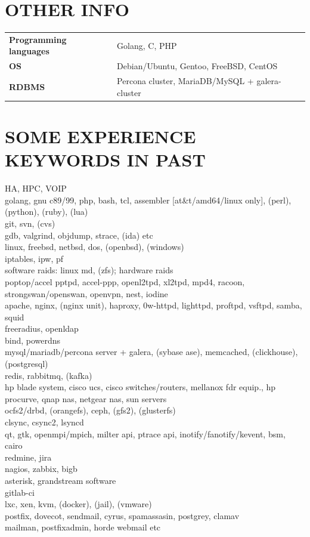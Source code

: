\begin{resume}
\section{OTHER INFO}
\vspace{0.1in} 
\begin{tabular}{ll}
{\bf Programming languages} & Golang, C, PHP\\
{\bf OS}                    & Debian/Ubuntu, Gentoo, FreeBSD, CentOS\\
{\bf RDBMS}                 & Percona cluster, MariaDB/MySQL + galera-cluster\\
\end{tabular}

\section{SOME EXPERIENCE KEYWORDS IN PAST}
\vspace{0.1in} 
    HA, HPC, VOIP\\
    golang, gnu c89/99, php, bash, tcl, assembler [at\&t/amd64/linux only], (perl), (python), (ruby), (lua)\\
    git, svn, (cvs)\\
    gdb, valgrind, objdump, strace, (ida) etc\\
    linux, freebsd, netbsd, dos, (openbsd), (windows)\\
    iptables, ipw, pf\\
    software raids: linux md, (zfs); hardware raids\\
    poptop/accel pptpd, accel-ppp, openl2tpd, xl2tpd, mpd4, racoon, strongswan/openswan, openvpn, nest, iodine\\
    apache, nginx, (nginx unit), haproxy, 0w-httpd, lighttpd, proftpd, vsftpd, samba, squid\\
    freeradius, openldap\\
    bind, powerdns\\
    mysql/mariadb/percona server + galera, (sybase ase), memcached, (clickhouse), (postgresql)\\
    redis, rabbitmq, (kafka)\\
    hp blade system, cisco ucs, cisco switches/routers, mellanox fdr equip., hp procurve, qnap nas, netgear nas, sun servers\\
    ocfs2/drbd, (orangefs), ceph, (gfs2), (glusterfs)\\
    clsync, csync2, lsyncd\\
    qt, gtk, openmpi/mpich, milter api, ptrace api, inotify/fanotify/kevent, bsm, cairo\\
    redmine, jira\\
    nagios, zabbix, bigb\\
    asterisk, grandstream software\\
    gitlab-ci\\
    lxc, xen, kvm, (docker), (jail), (vmware)\\
    postfix, dovecot, sendmail, cyrus, spamassasin, postgrey, clamav\\
    mailman, postfixadmin, horde webmail etc\\

\end{resume}
